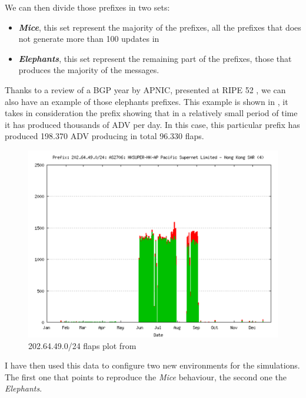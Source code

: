 We can then divide those prefixes in two sets:
\begin{itemize}
	\item \textbf{\textit{Mice}}, this set represent the majority of the prefixes,
		all the prefixes that does not generate more than \num{100} updates
		in 
	\item \textbf{\textit{Elephants}}, this set represent the remaining part
		of the prefixes, those that produces the majority of the messages.
\end{itemize}

Thanks to a review of a \ac{BGP} year by APNIC, presented at RIPE 52 \cite{huston2006bgp}, we can also have an example of those elephants prefixes.
This example is shown in , it takes in consideration the
prefix  showing that in a relatively small period of time it has
produced thousands of \ac{ADV} per day.
In this case, this particular prefix has produced \num{198,370} \ac{ADV} producing
in total \num{96,330} flaps.

\begin{figure}[h]
    \centering
    \includegraphics[scale=0.22]{images/RFD/miceVSelephants/ripePrefixFlap.png}
	\caption{202.64.49.0/24 flaps plot from \cite{huston2006bgp}}
    \label{fig:ripePrefixFlaps}
\end{figure}

I have then used this data to configure two new environments for the simulations.
The first one that points to reproduce the \textit{Mice} behaviour, the second
one the \textit{Elephants}.

